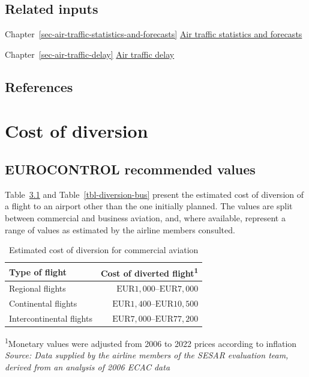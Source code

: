 \documentclass[
  11pt,
  a4paper,
]{book}
\begin{document}
\hypertarget{related-inputs-12}{%
\section{Related inputs}\label{related-inputs-12}}

Chapter~\ref{sec-air-traffic-statistics-and-forecasts}
\protect\hyperlink{sec-air-traffic-statistics-and-forecasts}{Air traffic
statistics and forecasts}

Chapter~\ref{sec-air-traffic-delay}
\protect\hyperlink{sec-air-traffic-delay}{Air traffic delay}

\hypertarget{references-16}{%
\section{References}\label{references-16}}

\hypertarget{sec-cost-of-diversions}{%
\chapter{Cost of diversion}\label{sec-cost-of-diversions}}

\hypertarget{eurocontrol-recommended-values-14}{%
\section{EUROCONTROL recommended
values}\label{eurocontrol-recommended-values-14}}

Table~\ref{tbl-diversion-comm} and Table~\ref{tbl-diversion-bus} present
the estimated cost of diversion of a flight to an airport other than the
one initially planned. The values are split between commercial and
business aviation, and, where available, represent a range of values as
estimated by the airline members consulted.

\hypertarget{tbl-diversion-comm}{}
\setlength{\LTpost}{0mm}
\begin{longtable}{lr}
\caption{\label{tbl-diversion-comm}Estimated cost of diversion for commercial aviation }\tabularnewline

\toprule
Type of flight & Cost of diverted flight\textsuperscript{1} \\ 
\midrule
Regional flights & $\text{EUR}1,000$–$\text{EUR}7,000$ \\ 
Continental flights & $\text{EUR}1,400$–$\text{EUR}10,500$ \\ 
Intercontinental flights & $\text{EUR}7,000$–$\text{EUR}77,200$ \\ 
\bottomrule
\end{longtable}
\begin{minipage}{\linewidth}
\textsuperscript{1}Monetary values were adjusted from 2006 to 2022 prices according to inflation\\
\emph{Source: Data supplied by the airline members of the SESAR evaluation team, derived from an analysis of 2006 ECAC data}\\
\end{minipage}
\end{document}
